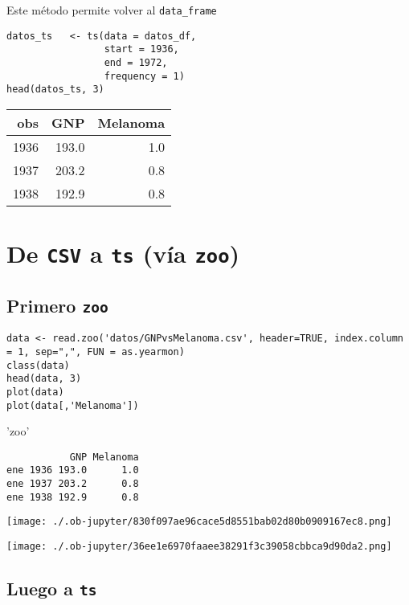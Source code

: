 \documentclass[11pt]{article}
\begin{document}
Este método permite volver al \texttt{data\_frame}

\begin{verbatim}
datos_ts   <- ts(data = datos_df,
                 start = 1936,
                 end = 1972,
                 frequency = 1)
head(datos_ts, 3)
\end{verbatim}

\label{}
\begin{center}
\begin{tabular}{rrr}
obs & GNP & Melanoma\\
\hline
1936 & 193.0 & 1.0\\
1937 & 203.2 & 0.8\\
1938 & 192.9 & 0.8\\
\end{tabular}
\end{center}
\section{De \texttt{CSV} a \texttt{ts} (vía \texttt{zoo})}
\label{sec:org1eac034}

\subsection{Primero \texttt{zoo}}
\label{sec:org2c8be8b}

\begin{verbatim}
data <- read.zoo('datos/GNPvsMelanoma.csv', header=TRUE, index.column = 1, sep=",", FUN = as.yearmon)
class(data)
head(data, 3)
plot(data)
plot(data[,'Melanoma'])
\end{verbatim}

\label{}
'zoo'
\begin{verbatim}
           GNP Melanoma
ene 1936 193.0      1.0
ene 1937 203.2      0.8
ene 1938 192.9      0.8
\end{verbatim}

\begin{center}
\texttt{[image: ./.ob-jupyter/830f097ae96cace5d8551bab02d80b0909167ec8.png]}
\end{center}
\begin{center}
\texttt{[image: ./.ob-jupyter/36ee1e6970faaee38291f3c39058cbbca9d90da2.png]}
\end{center}
\subsection{Luego a \texttt{ts}}
\label{sec:org87ad3f1}
\end{document}
